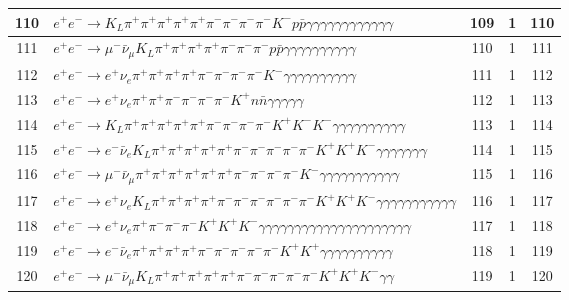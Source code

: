 \documentclass[landscape]{article}
\begin{document}
\begin{table}[htbp!]
\begin{tabular}{|c|>{\centering}p{18cm}|c|c|c|}
\hline
110 & $ e^{+} e^{-} \rightarrow K_{L} \pi^{+} \pi^{+} \pi^{+} \pi^{+} \pi^{+} \pi^{-} \pi^{-} \pi^{-} \pi^{-} K^{-} p \bar{p} \gamma \gamma \gamma \gamma \gamma \gamma \gamma \gamma \gamma \gamma \gamma \gamma $ & 109 & 1 & 110 \\
\hline
111 & $ e^{+} e^{-} \rightarrow \mu^{-} \bar{\nu}_{\mu} K_{L} \pi^{+} \pi^{+} \pi^{+} \pi^{+} \pi^{-} \pi^{-} \pi^{-} p \bar{p} \gamma \gamma \gamma \gamma \gamma \gamma \gamma \gamma \gamma \gamma $ & 110 & 1 & 111 \\
\hline
112 & $ e^{+} e^{-} \rightarrow e^{+} \nu_{e} \pi^{+} \pi^{+} \pi^{+} \pi^{+} \pi^{-} \pi^{-} \pi^{-} \pi^{-} K^{-} \gamma \gamma \gamma \gamma \gamma \gamma \gamma \gamma \gamma \gamma $ & 111 & 1 & 112 \\
\hline
113 & $ e^{+} e^{-} \rightarrow e^{+} \nu_{e} \pi^{+} \pi^{+} \pi^{-} \pi^{-} \pi^{-} \pi^{-} K^{+} n \bar{n} \gamma \gamma \gamma \gamma \gamma $ & 112 & 1 & 113 \\
\hline
114 & $ e^{+} e^{-} \rightarrow K_{L} \pi^{+} \pi^{+} \pi^{+} \pi^{+} \pi^{+} \pi^{-} \pi^{-} \pi^{-} \pi^{-} K^{+} K^{-} K^{-} \gamma \gamma \gamma \gamma \gamma \gamma \gamma \gamma \gamma \gamma $ & 113 & 1 & 114 \\
\hline
115 & $ e^{+} e^{-} \rightarrow e^{-} \bar{\nu}_{e} K_{L} \pi^{+} \pi^{+} \pi^{+} \pi^{+} \pi^{+} \pi^{-} \pi^{-} \pi^{-} \pi^{-} \pi^{-} K^{+} K^{+} K^{-} \gamma \gamma \gamma \gamma \gamma \gamma \gamma $ & 114 & 1 & 115 \\
\hline
116 & $ e^{+} e^{-} \rightarrow \mu^{-} \bar{\nu}_{\mu} \pi^{+} \pi^{+} \pi^{+} \pi^{+} \pi^{+} \pi^{+} \pi^{-} \pi^{-} \pi^{-} \pi^{-} K^{-} \gamma \gamma \gamma \gamma \gamma \gamma \gamma \gamma \gamma \gamma \gamma $ & 115 & 1 & 116 \\
\hline
117 & $ e^{+} e^{-} \rightarrow e^{+} \nu_{e} K_{L} \pi^{+} \pi^{+} \pi^{+} \pi^{+} \pi^{-} \pi^{-} \pi^{-} \pi^{-} \pi^{-} \pi^{-} K^{+} K^{+} K^{-} \gamma \gamma \gamma \gamma \gamma \gamma \gamma \gamma \gamma \gamma \gamma $ & 116 & 1 & 117 \\
\hline
118 & $ e^{+} e^{-} \rightarrow e^{+} \nu_{e} \pi^{+} \pi^{-} \pi^{-} \pi^{-} K^{+} K^{+} K^{-} \gamma \gamma \gamma \gamma \gamma \gamma \gamma \gamma \gamma \gamma \gamma \gamma \gamma \gamma \gamma \gamma \gamma \gamma \gamma \gamma \gamma $ & 117 & 1 & 118 \\
\hline
119 & $ e^{+} e^{-} \rightarrow e^{-} \bar{\nu}_{e} \pi^{+} \pi^{+} \pi^{+} \pi^{+} \pi^{-} \pi^{-} \pi^{-} \pi^{-} \pi^{-} K^{+} K^{+} \gamma \gamma \gamma \gamma \gamma \gamma \gamma \gamma \gamma \gamma $ & 118 & 1 & 119 \\
\hline
120 & $ e^{+} e^{-} \rightarrow \mu^{-} \bar{\nu}_{\mu} K_{L} \pi^{+} \pi^{+} \pi^{+} \pi^{+} \pi^{+} \pi^{-} \pi^{-} \pi^{-} \pi^{-} \pi^{-} K^{+} K^{+} K^{-} \gamma \gamma $ & 119 & 1 & 120 \\
\hline
\end{tabular}
\end{table}
\end{document}
